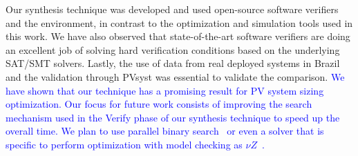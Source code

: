 \documentclass[runningheads]{llncs}
\begin{document}
Our synthesis technique was developed and used open-source software verifiers and the environment, in contrast to the optimization and simulation tools used in this work. We have also observed that state-of-the-art software verifiers are doing an excellent job of solving hard verification conditions based on the underlying SAT/SMT solvers. Lastly, the use of data from real deployed systems in Brazil and the validation through PVsyst was essential to validate the comparison. \textcolor{blue}{We have shown that our technique has a promising result for PV system sizing optimization. Our focus for future work consists of improving the search mechanism used in the {\sc Verify} phase of our synthesis technique to speed up the overall time. We plan to use parallel binary search~\cite{TrindadeDJISC17} or even a solver that is specific to perform optimization with model checking as $\nu Z$~\cite{BjornerPF15}.}

%
%



%
\end{document}
